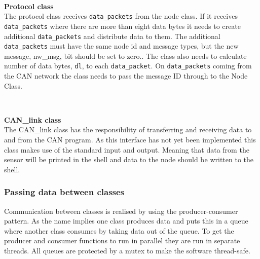 ~\\ \par \textbf{Protocol class} ~ \\
The protocol class receives \texttt{data\_packets} from the node class. 
If it receives \texttt{data\_packets} where there are more than eight data bytes it needs to create additional \texttt{data\_packets} and distribute data to them. 
The additional \texttt{data\_packets} must have the same node id and message types, but the new message, nw\_msg, bit should be set to zero..
The class also needs to calculate number of data bytes, \texttt{dl}, to each \texttt{data\_packet}.
On \texttt{data\_packets} coming from the CAN network the class needs to pass the message ID through to the Node Class.

~\\ \par \textbf{CAN\_link class} ~ \\
The CAN\_link class has the responsibility of transferring and receiving data to and from the CAN program.
As this interface has not yet been implemented this class makes use of the standard input and output. 
Meaning that data from the sensor will be printed in the shell and data to the node should be written to the shell. 

\subsubsection*{Passing data between classes}
Communication between classes is realised by using the producer-consumer pattern.
As the name implies one class produces data and puts this in a queue where another class consumes by taking data out of the queue.
To get the producer and consumer functions to run in parallel they are run in separate threads.
All queues are protected by a mutex to make the software thread-safe.

